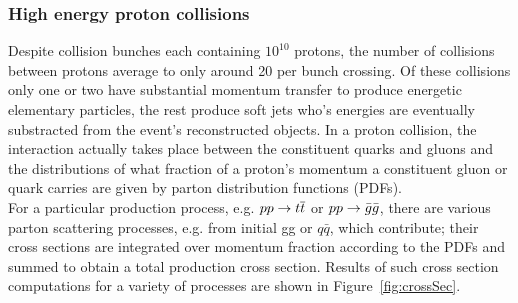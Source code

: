 \FloatBarrier
\subsubsection{High energy proton collisions}
\cite{green2005high}
Despite collision bunches each containing $10^{10}$ protons, the number of collisions
between protons average to only around 20 per bunch crossing. Of these collisions only
one or two have substantial momentum transfer to produce energetic elementary 
particles, the rest produce soft jets who's energies are eventually substracted from the event's
reconstructed objects. In a proton collision, the interaction actually takes place between the 
constituent quarks and gluons and the distributions of what fraction of a proton's momentum a 
constituent gluon or quark carries are given by parton distribution functions (PDFs). \\
\indent For a particular production process, e.g. $pp \rightarrow \relax{t}\overline{\relax{t}}$ or $pp \rightarrow \bar{g}\bar{g}$, there are 
various parton scattering processes, e.g. from initial gg or $q\bar{q}$, which contribute; their cross sections 
are integrated over momentum fraction according to the PDFs and summed to obtain a total production cross section.
Results of such cross section computations for a variety of processes are shown
in Figure~\ref{fig:crossSec}.

